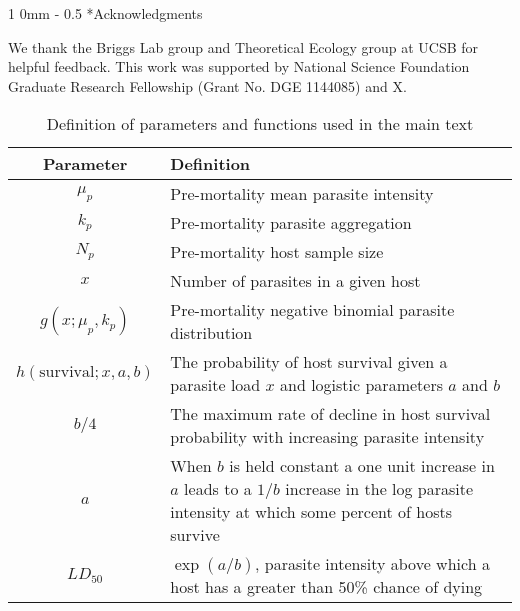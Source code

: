\documentclass[12pt, a4paper]{article}
\makeatletter
\renewcommand{\section}{\@startsection
{section}%
{1}%
{0mm}%
{-\baselineskip}%
{0.5\baselineskip}%
{\normalfont\bf\large}} %
\makeatother
\begin{document}
\section*{Acknowledgments}

We thank the Briggs Lab group and Theoretical Ecology group at UCSB for helpful feedback.  This work was supported by National Science Foundation Graduate Research Fellowship (Grant No. DGE 1144085) and X.



\singlespacing



\newpage

\renewcommand{\arraystretch}{1.2}

\begin{table}
    \centering
    \caption{Definition of parameters and functions used in the main text}
    \begin{tabular}{c p{12cm}}
    \hline
    Parameter & Definition \\
    \hline\hline
    $\mu_p$ & Pre-mortality mean parasite intensity \\
    $k_p$   & Pre-mortality parasite aggregation \\
    $N_p$   & Pre-mortality host sample size \\
    $x$     & Number of parasites in a given host \\
    $g(x; \mu_p, k_p)$ & Pre-mortality negative binomial parasite distribution \\

    $h(\text{survival}; x, a, b)$ & The probability of host survival given a parasite load $x$ and logistic parameters $a$ and $b$\\

    $b / 4$ & The maximum rate of decline in host survival probability with increasing parasite intensity  \\
    $a$ & When $b$ is held constant a one unit increase in $a$ leads to a $1 / b$ increase in the log parasite intensity at which some percent of hosts survive\\
    $LD_{50}$ & $\exp(a / b)$, parasite intensity above which a host has a greater than 50\% chance of dying \\

    \end{tabular}
    \label{tab:params}
\end{table}
\end{document}
